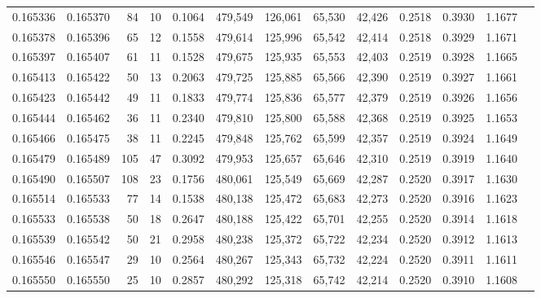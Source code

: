 \begin{tabular}{rrrrrrrrrrrrr}
0.165336 & 0.165370 &    84 &  10 &                                     0.1064 & 479,549 & 126,061 &  65,530 &  42,426 & 0.2518 & 0.3930 & 1.1677 \\
0.165378 & 0.165396 &    65 &  12 &                                     0.1558 & 479,614 & 125,996 &  65,542 &  42,414 & 0.2518 & 0.3929 & 1.1671 \\
0.165397 & 0.165407 &    61 &  11 &                                     0.1528 & 479,675 & 125,935 &  65,553 &  42,403 & 0.2519 & 0.3928 & 1.1665 \\
0.165413 & 0.165422 &    50 &  13 &                                     0.2063 & 479,725 & 125,885 &  65,566 &  42,390 & 0.2519 & 0.3927 & 1.1661 \\
0.165423 & 0.165442 &    49 &  11 &                                     0.1833 & 479,774 & 125,836 &  65,577 &  42,379 & 0.2519 & 0.3926 & 1.1656 \\
0.165444 & 0.165462 &    36 &  11 &                                     0.2340 & 479,810 & 125,800 &  65,588 &  42,368 & 0.2519 & 0.3925 & 1.1653 \\
0.165466 & 0.165475 &    38 &  11 &                                     0.2245 & 479,848 & 125,762 &  65,599 &  42,357 & 0.2519 & 0.3924 & 1.1649 \\
0.165479 & 0.165489 &   105 &  47 &                                     0.3092 & 479,953 & 125,657 &  65,646 &  42,310 & 0.2519 & 0.3919 & 1.1640 \\
0.165490 & 0.165507 &   108 &  23 &                                     0.1756 & 480,061 & 125,549 &  65,669 &  42,287 & 0.2520 & 0.3917 & 1.1630 \\
0.165514 & 0.165533 &    77 &  14 &                                     0.1538 & 480,138 & 125,472 &  65,683 &  42,273 & 0.2520 & 0.3916 & 1.1623 \\
0.165533 & 0.165538 &    50 &  18 &                                     0.2647 & 480,188 & 125,422 &  65,701 &  42,255 & 0.2520 & 0.3914 & 1.1618 \\
0.165539 & 0.165542 &    50 &  21 &                                     0.2958 & 480,238 & 125,372 &  65,722 &  42,234 & 0.2520 & 0.3912 & 1.1613 \\
0.165546 & 0.165547 &    29 &  10 &                                     0.2564 & 480,267 & 125,343 &  65,732 &  42,224 & 0.2520 & 0.3911 & 1.1611 \\
0.165550 & 0.165550 &    25 &  10 &                                     0.2857 & 480,292 & 125,318 &  65,742 &  42,214 & 0.2520 & 0.3910 & 1.1608 \\

\end{tabular}
